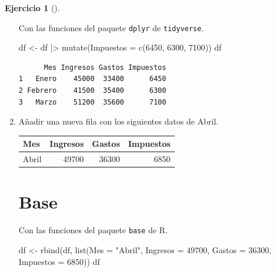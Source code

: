 \documentclass[
  a4paper,
]{scrreport}
\newenvironment{Shaded}{\begin{snugshade}}{\end{snugshade}}
\newcommand{\AttributeTok}[1]{\textcolor[rgb]{0.40,0.45,0.13}{#1}}
\newcommand{\DecValTok}[1]{\textcolor[rgb]{0.68,0.00,0.00}{#1}}
\newcommand{\FunctionTok}[1]{\textcolor[rgb]{0.28,0.35,0.67}{#1}}
\newcommand{\NormalTok}[1]{\textcolor[rgb]{0.00,0.23,0.31}{#1}}
\newcommand{\OtherTok}[1]{\textcolor[rgb]{0.00,0.23,0.31}{#1}}
\newcommand{\SpecialCharTok}[1]{\textcolor[rgb]{0.37,0.37,0.37}{#1}}
\newcommand{\StringTok}[1]{\textcolor[rgb]{0.13,0.47,0.30}{#1}}
\theoremstyle{definition}
\newtheorem{exercise}{Ejercicio}[chapter]
\theoremstyle{remark}
\begin{document}
\begin{exercise}[]
\begin{enumerate}
\begin{tcolorbox}
  Con las funciones del paquete \texttt{dplyr} de \texttt{tidyverse}.

\begin{Shaded}
\begin{Highlighting}[]
\NormalTok{df }\OtherTok{\textless{}{-}}\NormalTok{ df }\SpecialCharTok{|\textgreater{}} \FunctionTok{mutate}\NormalTok{(}\AttributeTok{Impuestos =} \FunctionTok{c}\NormalTok{(}\DecValTok{6450}\NormalTok{, }\DecValTok{6300}\NormalTok{, }\DecValTok{7100}\NormalTok{))}
\NormalTok{df}
\end{Highlighting}
\end{Shaded}

\begin{verbatim}
      Mes Ingresos Gastos Impuestos
1   Enero    45000  33400      6450
2 Febrero    41500  35400      6300
3   Marzo    51200  35600      7100
\end{verbatim}

  \end{tcolorbox}
\item
  Añadir una nueva fila con los siguientes datos de Abril.

  \begin{longtable}[]{@{}lrrr@{}}
  \toprule\noalign{}
  Mes & Ingresos & Gastos & Impuestos \\
  \midrule\noalign{}
  \endhead
  \bottomrule\noalign{}
  \endlastfoot
  Abril & 49700 & 36300 & 6850 \\
  \end{longtable}

  \begin{tcolorbox}[enhanced jigsaw, breakable, toptitle=1mm, colbacktitle=quarto-callout-tip-color!10!white, rightrule=.15mm, opacityback=0, opacitybacktitle=0.6, titlerule=0mm, coltitle=black, colframe=quarto-callout-tip-color-frame, colback=white, bottomtitle=1mm, leftrule=.75mm, toprule=.15mm, title=\textcolor{quarto-callout-tip-color}{\faLightbulb}\hspace{0.5em}{Solución}, arc=.35mm, bottomrule=.15mm, left=2mm]

  \section{Base}

  Con las funciones del paquete \texttt{base} de R.

\begin{Shaded}
\begin{Highlighting}[]
\NormalTok{df }\OtherTok{\textless{}{-}} \FunctionTok{rbind}\NormalTok{(df, }\FunctionTok{list}\NormalTok{(}\AttributeTok{Mes =} \StringTok{"Abril"}\NormalTok{, }\AttributeTok{Ingresos =} \DecValTok{49700}\NormalTok{, }\AttributeTok{Gastos =} \DecValTok{36300}\NormalTok{, }\AttributeTok{Impuestos =} \DecValTok{6850}\NormalTok{))}
\NormalTok{df}
\end{Highlighting}
\end{Shaded}


\end{tcolorbox}
\end{enumerate}
\end{exercise}
\end{document}
